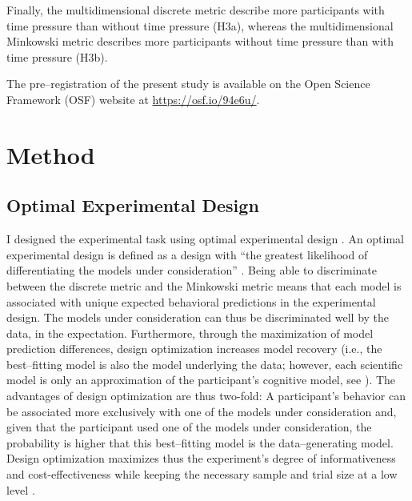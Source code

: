 \documentclass[a4paper,man,natbib]{apa6}
\begin{document}
Finally, the multidimensional discrete metric describe more participants with time pressure than without time pressure (H3a), whereas the multidimensional Minkowski metric describes more participants without time pressure than with time pressure (H3b).

The pre--registration of the present study is available on the Open Science Framework (OSF) website at \href{https://osf.io/94e6u/}{https://osf.io/94e6u/}.

\section{Method}

\subsection{Optimal Experimental Design}
I designed the experimental task using optimal experimental design \citep{myung2009optimal}. An optimal experimental design is defined as a design with ``the greatest likelihood of differentiating the models under consideration'' \cite[][p. 500]{myung2009optimal}. Being able to discriminate between the discrete metric and the Minkowski metric means that each model is associated with unique expected behavioral predictions in the experimental design. The models under consideration can thus be discriminated well by the data, in the expectation. Furthermore, through the maximization of model prediction differences, design optimization increases model recovery (i.e., the best--fitting model is also the model underlying the data; however, each scientific model is only an approximation of the participant's cognitive model, see \citealp{myung2009optimal}). The advantages of design optimization are thus two-fold: A participant's behavior can be associated more exclusively with one of the models under consideration and, given that the participant used one of the models under consideration, the probability is higher that this best--fitting model is the data--generating model. Design optimization maximizes thus the experiment's degree of informativeness and cost-effectiveness while keeping the necessary sample and trial size at a low level \citep{cavagnaro2009better, ouyang2016practical, raffert2012optimally, atkinson2007optimum, nelson2005finding}. 
\end{document}
